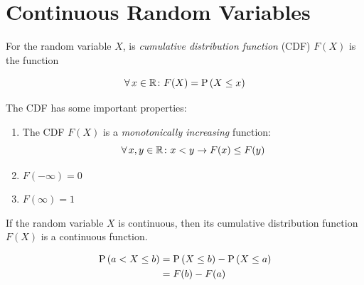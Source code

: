 \section{Continuous Random Variables}

\begin{definition}
    For the random variable $X$, is \textit{cumulative distribution function}
    (CDF) $F(X)$ is the function

    \begin{equation}
        \operatorname{\forall} x \in \mathbb{R} \colon F(X) = \mathrm{P} \left( X \le x \right)
    \end{equation}

    The CDF has some important properties:
    
    \begin{enumerate}
        \item The CDF $F(X)$ is a \textit{monotonically increasing} function:
        \begin{equation}
            \operatorname{\forall} x, y \in \mathbb{R} \colon x < y \to F(x) \le F(y)
        \end{equation}
        \item $F(-\infty) = 0$
        \item $F(\infty) = 1$
    \end{enumerate}
    
    If the random variable $X$ is continuous, then its cumulative distribution function $F(X)$ is a continuous function.
\end{definition}

\begin{align}
    \mathrm{P} \left( a < X \le b \right)
    &= \mathrm{P} \left( X \le b \right) - \mathrm{P} \left( X \le a \right) \\
    &= F(b) - F(a)
\end{align}


